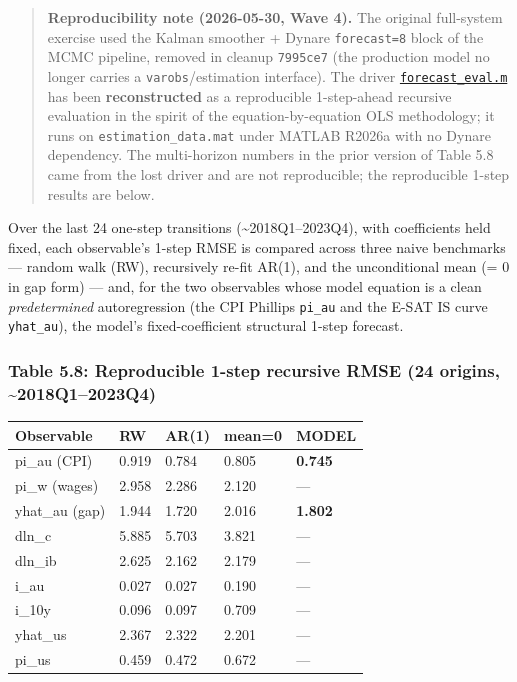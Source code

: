 \documentclass[
]{article}
\newcounter{none} %
\begin{document}
\begin{quote}
\textbf{Reproducibility note (2026-05-30, Wave 4).} The original
full-system exercise used the Kalman smoother + Dynare
\texttt{forecast=8} block of the MCMC pipeline, removed in cleanup
\texttt{7995ce7} (the production model no longer carries a
\texttt{varobs}/estimation interface). The driver
\href{forecast_eval.m}{\texttt{forecast\_eval.m}} has been
\textbf{reconstructed} as a reproducible 1-step-ahead recursive
evaluation in the spirit of the equation-by-equation OLS methodology; it
runs on \texttt{estimation\_data.mat} under MATLAB R2026a with no Dynare
dependency. The multi-horizon numbers in the prior version of Table 5.8
came from the lost driver and are not reproducible; the reproducible
1-step results are below.
\end{quote}

Over the last 24 one-step transitions (\textasciitilde2018Q1--2023Q4),
with coefficients held fixed, each observable's 1-step RMSE is compared
across three naive benchmarks --- random walk (RW), recursively re-fit
AR(1), and the unconditional mean (= 0 in gap form) --- and, for the two
observables whose model equation is a clean \emph{predetermined}
autoregression (the CPI Phillips \texttt{pi\_au} and the E-SAT IS curve
\texttt{yhat\_au}), the model's fixed-coefficient structural 1-step
forecast.

\subsubsection{Table 5.8: Reproducible 1-step recursive RMSE (24
origins,
\textasciitilde2018Q1--2023Q4)}\label{table-5.8-reproducible-1-step-recursive-rmse-24-origins-2018q12023q4}

{\def\LTcaptype{none} %
\begin{longtable}[]{@{}lllll@{}}
\toprule\noalign{}
Observable & RW & AR(1) & mean=0 & MODEL \\
\midrule\noalign{}
\endhead
\bottomrule\noalign{}
\endlastfoot
pi\_au (CPI) & 0.919 & 0.784 & 0.805 & \textbf{0.745} \\
pi\_w (wages) & 2.958 & 2.286 & 2.120 & --- \\
yhat\_au (gap) & 1.944 & 1.720 & 2.016 & \textbf{1.802} \\
dln\_c & 5.885 & 5.703 & 3.821 & --- \\
dln\_ib & 2.625 & 2.162 & 2.179 & --- \\
i\_au & 0.027 & 0.027 & 0.190 & --- \\
i\_10y & 0.096 & 0.097 & 0.709 & --- \\
yhat\_us & 2.367 & 2.322 & 2.201 & --- \\
pi\_us & 0.459 & 0.472 & 0.672 & --- \\
\end{longtable}
}
\end{document}
